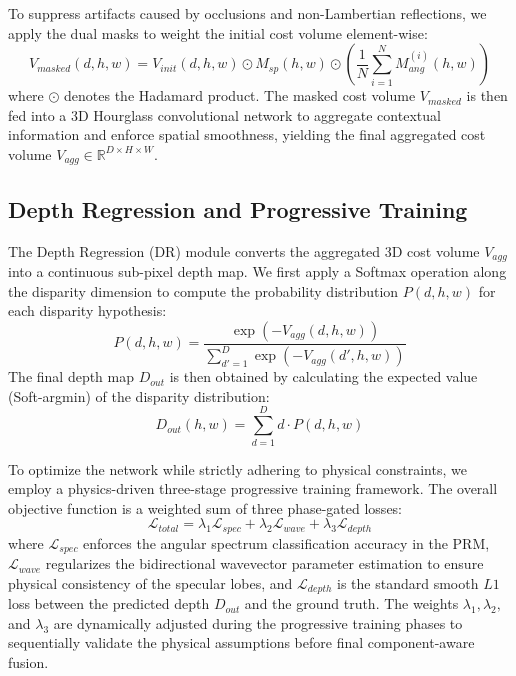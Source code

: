 \documentclass[lettersize,journal]{IEEEtran}
\begin{document}
To suppress artifacts caused by occlusions and non-Lambertian reflections, we apply the dual masks to weight the initial cost volume element-wise:
\begin{equation}
\label{eq:eq12}
V_{masked}(d, h, w) = V_{init}(d, h, w) \odot M_{sp}(h,w) \odot \left( \frac{1}{N} \sum_{i=1}^{N} M_{ang}^{(i)}(h,w) \right)
\end{equation}
where $\odot$ denotes the Hadamard product. The masked cost volume $V_{masked}$ is then fed into a 3D Hourglass convolutional network to aggregate contextual information and enforce spatial smoothness, yielding the final aggregated cost volume $V_{agg} \in \mathbb{R}^{D \times H \times W}$.

\subsection{Depth Regression and Progressive Training}

The Depth Regression (DR) module converts the aggregated 3D cost volume $V_{agg}$ into a continuous sub-pixel depth map. We first apply a Softmax operation along the disparity dimension to compute the probability distribution $P(d, h, w)$ for each disparity hypothesis:
\begin{equation}
\label{eq:eq13}
P(d, h, w) = \frac{\exp(-V_{agg}(d, h, w))}{\sum_{d'=1}^{D} \exp(-V_{agg}(d', h, w))}
\end{equation}
The final depth map $D_{out}$ is then obtained by calculating the expected value (Soft-argmin) of the disparity distribution:
\begin{equation}
\label{eq:eq14}
D_{out}(h, w) = \sum_{d=1}^{D} d \cdot P(d, h, w)
\end{equation}

To optimize the network while strictly adhering to physical constraints, we employ a physics-driven three-stage progressive training framework. The overall objective function is a weighted sum of three phase-gated losses:
\begin{equation}
\label{eq:eq15}
\mathcal{L}_{total} = \lambda_1 \mathcal{L}_{spec} + \lambda_2 \mathcal{L}_{wave} + \lambda_3 \mathcal{L}_{depth}
\end{equation}
where $\mathcal{L}_{spec}$ enforces the angular spectrum classification accuracy in the PRM, $\mathcal{L}_{wave}$ regularizes the bidirectional wavevector parameter estimation to ensure physical consistency of the specular lobes, and $\mathcal{L}_{depth}$ is the standard smooth $L1$ loss between the predicted depth $D_{out}$ and the ground truth. The weights $\lambda_1, \lambda_2,$ and $\lambda_3$ are dynamically adjusted during the progressive training phases to sequentially validate the physical assumptions before final component-aware fusion.
\end{document}
